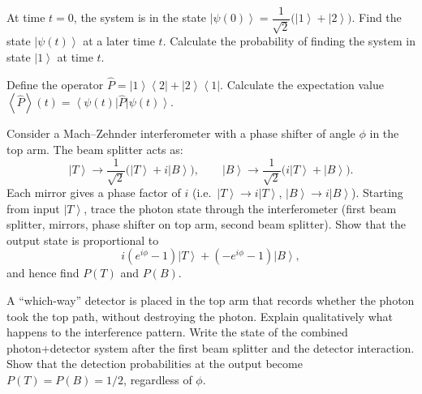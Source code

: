 \documentclass[12pt,a4paper]{article}
\renewcommand{\ket}[1]{\left|#1\right\rangle}
\renewcommand{\bra}[1]{\left\langle #1\right|}
\renewcommand{\ketbra}[2]{\left|#1\right\rangle\!\left\langle #2\right|}
\renewcommand{\expect}[1]{\left\langle #1\right\rangle}
\begin{document}
\begin{parts}
\item At time $t = 0$, the system is in the state $\ket{\psi(0)} = \dfrac{1}{\sqrt{2}}\bigl(\ket{1} + \ket{2}\bigr)$. Find the state $\ket{\psi(t)}$ at a later time $t$. Calculate the probability of finding the system in state $\ket{1}$ at time $t$. 

\item Define the operator $\hat{P} = \ketbra{1}{2} + \ketbra{2}{1}$. Calculate the expectation value $\expect{\hat{P}}(t) = \bra{\psi(t)}\hat{P}\ket{\psi(t)}$. 

\item Consider a Mach--Zehnder interferometer with a phase shifter of angle $\phi$ in the top arm. The beam splitter acts as:
\[
\ket{T} \to \frac{1}{\sqrt{2}}\bigl(\ket{T} + i\ket{B}\bigr), \qquad \ket{B} \to \frac{1}{\sqrt{2}}\bigl(i\ket{T} + \ket{B}\bigr).
\]
Each mirror gives a phase factor of $i$ (i.e.\ $\ket{T}\to i\ket{T}$, $\ket{B}\to i\ket{B}$). Starting from input $\ket{T}$, trace the photon state through the interferometer (first beam splitter, mirrors, phase shifter on top arm, second beam splitter). Show that the output state is proportional to
\[
i(e^{i\phi}-1)\ket{T} + (- e^{i\phi}-1)\ket{B},
\]
and hence find $P(T)$ and $P(B)$. 

\item A ``which-way'' detector is placed in the top arm that records whether the photon took the top path, without destroying the photon. Explain qualitatively what happens to the interference pattern. Write the state of the combined photon+detector system after the first beam splitter and the detector interaction. Show that the detection probabilities at the output become $P(T) = P(B) = 1/2$, regardless of $\phi$. 
\end{parts}

\newpage


\end{document}
